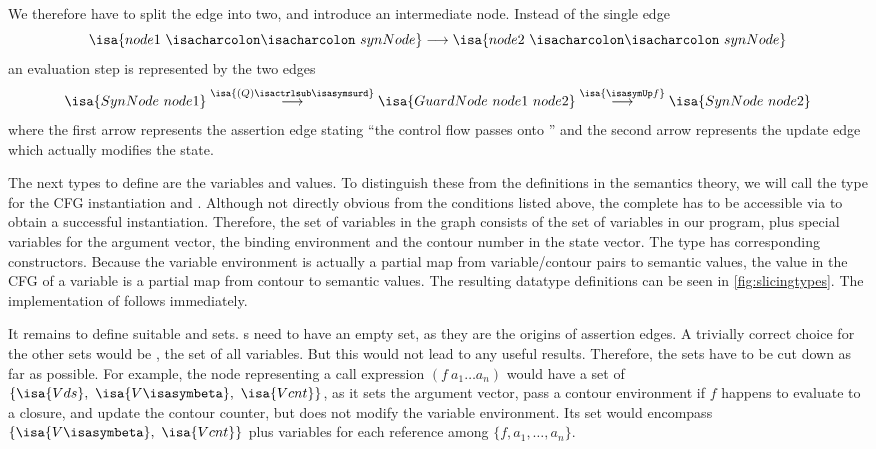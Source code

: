 \documentclass[a4paper,parskip=half,BCOR=8mm,DIV=calc,12pt]{scrbook}
\begin{document}
We therefore have to split the edge into two, and introduce an intermediate node. Instead of the single edge
\[
\isa{node1\ \isacharcolon\isacharcolon\ synNode} \longrightarrow \isa{node2\ \isacharcolon\isacharcolon\ synNode}
\]
an evaluation step is represented by the two edges
\[
\isa{SynNode\ node1}
\stackrel{\isa{(Q)\isactrlsub\isasymsurd}}\longrightarrow
\isa{GuardNode\ node1\ node2}
\stackrel{\isa{\isasymUp f}}\longrightarrow
\isa{SynNode\ node2}
\]
where the first arrow represents the assertion edge stating “the control flow passes onto ” and the second arrow represents the update edge which actually modifies the state.

The next types to define are the variables and values. To distinguish these from the definitions in the semantics theory, we will call the type for the CFG instantiation  and . Although not directly obvious from the conditions listed above, the complete  has to be accessible via  to obtain a successful instantiation. Therefore, the set of variables in the graph consists of the set of variables in our program, plus special variables for the argument vector, the binding environment and the contour number in the state vector. The type  has corresponding constructors. Because the variable environment is actually a partial map from variable/contour pairs to semantic values, the value in the CFG of a variable is a partial map from contour to semantic values. The resulting datatype definitions can be seen in \vref{fig:slicingtypes}. The implementation of  follows immediately.

It remains to define suitable  and  sets. s need to have an empty  set, as they are the origins of assertion edges. A trivially correct choice for the other sets would be , the set of all variables. But this would not lead to any useful results. Therefore, the sets have to be cut down as far as possible. For example, the node representing a call expression $(f\ a_1\ldots a_n)$ would have a  set of $\{\isa{Vds},\ \isa{V\isasymbeta},\ \isa{Vcnt}\}$, as it sets the argument vector, pass a contour environment if $f$ happens to evaluate to a closure, and update the contour counter, but does not modify the variable environment. Its  set would encompass $\{\isa{V\isasymbeta},\ \isa{Vcnt}\}$ plus variables for each reference among $\{f,a_1,\ldots,a_n\}$.
\end{document}
